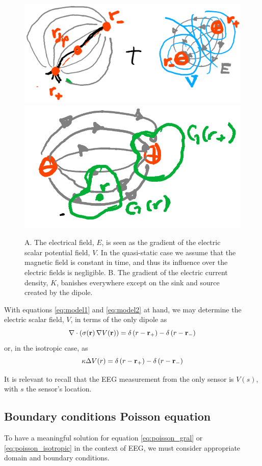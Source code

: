 \begin{figure}
\centering
\includegraphics[width=0.4\linewidth]{./img_dev/nsNeuronDipole}
\includegraphics[width=0.4\linewidth]{./img_dev/nsCurrDensField}
\caption{A. The electrical field, $E$, is seen as the gradient of the electric scalar potential field, $V$. In the quasi-static case we assume that the magnetic field is constant in time, and thus its influence over the electric fields is negligible. B. The gradient of the electric current density, $K$, banishes everywhere except on the sink and source created by the dipole. }
\label{fig:diagrams1}
\end{figure}

With equations \eqref{eq:model1} and \eqref{eq:model2} at hand, we may determine the electric scalar field, $V$, in terms of the only dipole as
\begin{equation}
\nabla \cdot\left( \sigma(\mathbf{r})\, \nabla V(\mathbf{r})  \right) = 
{\delta\left( r-\mathbf{r}_+ \right) - \delta\left( r-\mathbf{r}_- \right)}
\label{eq:poisson_gral}
\end{equation}
or, in the isotropic case, as
\begin{equation}
\kappa \Delta V(r) = 
{\delta\left( r-\mathbf{r}_+ \right) - \delta\left( r-\mathbf{r}_- \right)}
\label{eq:poisson_isotropic}
\end{equation}

It is relevant to recall that the EEG measurement from the only sensor is $V(s)$, with $s$ the sensor's location.


\subsection{Boundary conditions Poisson equation}

To have a meaningful solution for equation \eqref{eq:poisson_gral} or \eqref{eq:poisson_isotropic} in the context of EEG, we must consider appropriate domain and boundary conditions.

